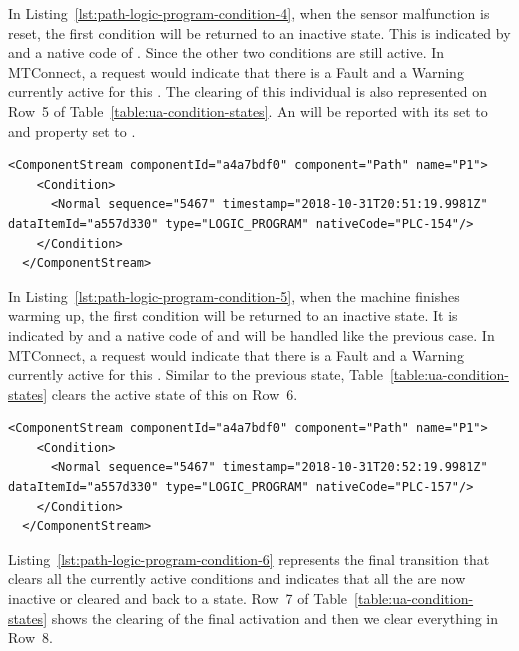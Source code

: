 In Listing~\ref{lst:path-logic-program-condition-4}, when the sensor malfunction is reset, the first condition will be returned to an inactive state. This is indicated by  and a native code of . Since the other two conditions are still active. In MTConnect, a  request would indicate that there is a Fault and a Warning currently active for this . The clearing of this individual  is also represented on Row~5 of Table~\ref{table:ua-condition-states}. An   will be reported with its  set to  and  property set to .

\begin{lstlisting}[firstnumber=last,escapechar=|,%
    caption={Path Logic Program Clear Fault of PLC-154},label={lst:path-logic-program-condition-4}]
  <ComponentStream componentId="a4a7bdf0" component="Path" name="P1">
    <Condition>
      <Normal sequence="5467" timestamp="2018-10-31T20:51:19.9981Z" dataItemId="a557d330" type="LOGIC_PROGRAM" nativeCode="PLC-154"/>
    </Condition>
  </ComponentStream>
\end{lstlisting}

In Listing~\ref{lst:path-logic-program-condition-5}, when the machine finishes warming up, the first condition will be returned to an inactive state. It is indicated by  and a native code of  and will be handled like the previous case. In MTConnect, a  request would indicate that there is a Fault and a Warning currently active for this . Similar to the previous state, Table~\ref{table:ua-condition-states} clears the active state of this  on Row~6.

\begin{lstlisting}[firstnumber=last,escapechar=|,%
    caption={Path Logic Program Clear Warning PLC-157},label={lst:path-logic-program-condition-5}]
  <ComponentStream componentId="a4a7bdf0" component="Path" name="P1">
    <Condition>
      <Normal sequence="5467" timestamp="2018-10-31T20:52:19.9981Z" dataItemId="a557d330" type="LOGIC_PROGRAM" nativeCode="PLC-157"/>
    </Condition>
  </ComponentStream>
\end{lstlisting}

Listing~\ref{lst:path-logic-program-condition-6} represents the final  transition that clears all the currently active conditions and indicates that all the  are now inactive or cleared and back to a  state. Row~7 of Table~\ref{table:ua-condition-states} shows the clearing of the final activation and then we clear everything in Row~8.

